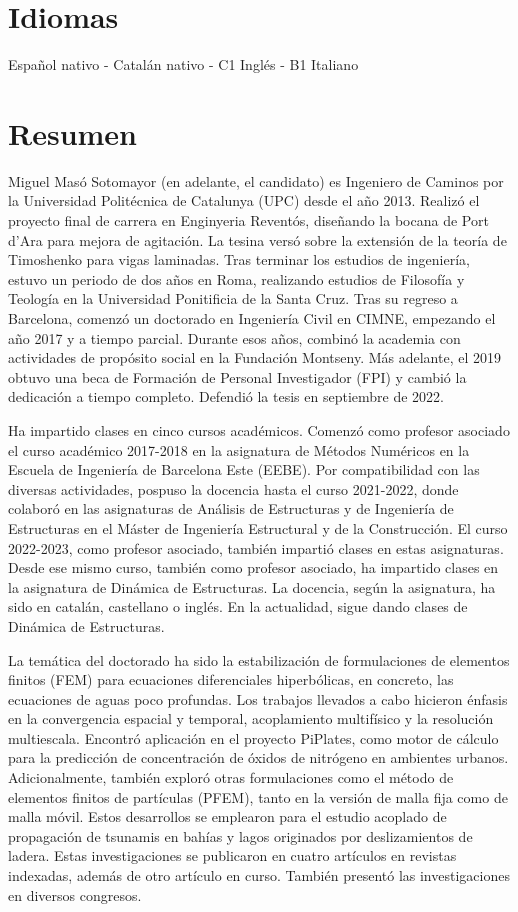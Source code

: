 \documentclass[12pt]{article}
\begin{document}
\section{Idiomas}
Español nativo - Catalán nativo - C1 Inglés - B1 Italiano


\section{Resumen}
Miguel Masó Sotomayor (en adelante, el candidato) es Ingeniero de Caminos por la Universidad Politécnica de Catalunya (UPC) desde el año 2013. Realizó el proyecto final de carrera en Enginyeria Reventós, diseñando la bocana de Port d'Ara para mejora de agitación. La tesina versó sobre la extensión de la teoría de Timoshenko para vigas laminadas. Tras terminar los estudios de ingeniería, estuvo un periodo de dos años en Roma, realizando estudios de Filosofía y Teología en la Universidad Ponitificia de la Santa Cruz. Tras su regreso a Barcelona, comenzó un doctorado en Ingeniería Civil en CIMNE, empezando el año 2017 y a tiempo parcial. Durante esos años, combinó la academia con actividades de propósito social en la Fundación Montseny. Más adelante, el 2019 obtuvo una beca de Formación de Personal Investigador (FPI) y cambió la dedicación a tiempo completo. Defendió la tesis en septiembre de 2022.

Ha impartido clases en cinco cursos académicos. Comenzó como profesor asociado el curso académico 2017-2018 en la asignatura de Métodos Numéricos en la Escuela de Ingeniería de Barcelona Este (EEBE). Por compatibilidad con las diversas actividades, pospuso la docencia hasta el curso 2021-2022, donde colaboró en las asignaturas de Análisis de Estructuras y de Ingeniería de Estructuras en el Máster de Ingeniería Estructural y de la Construcción. El curso 2022-2023, como profesor asociado, también impartió clases en estas asignaturas. Desde ese mismo curso, también como profesor asociado, ha impartido clases en la asignatura de Dinámica de Estructuras. La docencia, según la asignatura, ha sido en catalán, castellano o inglés. En la actualidad, sigue dando clases de Dinámica de Estructuras.

La temática del doctorado ha sido la estabilización de formulaciones de elementos finitos (FEM) para ecuaciones diferenciales hiperbólicas, en concreto, las ecuaciones de aguas poco profundas. Los trabajos llevados a cabo hicieron énfasis en la convergencia espacial y temporal, acoplamiento multifísico y la resolución multiescala. Encontró aplicación en el proyecto PiPlates, como motor de cálculo para la predicción de concentración de óxidos de nitrógeno en ambientes urbanos. Adicionalmente, también exploró otras formulaciones como el método de elementos finitos de partículas (PFEM), tanto en la versión de malla fija como de malla móvil. Estos desarrollos se emplearon para el estudio acoplado de propagación de tsunamis en bahías y lagos originados por deslizamientos de ladera. Estas investigaciones se publicaron en cuatro artículos en revistas indexadas, además de otro artículo en curso. También presentó las investigaciones en diversos congresos.
\end{document}

